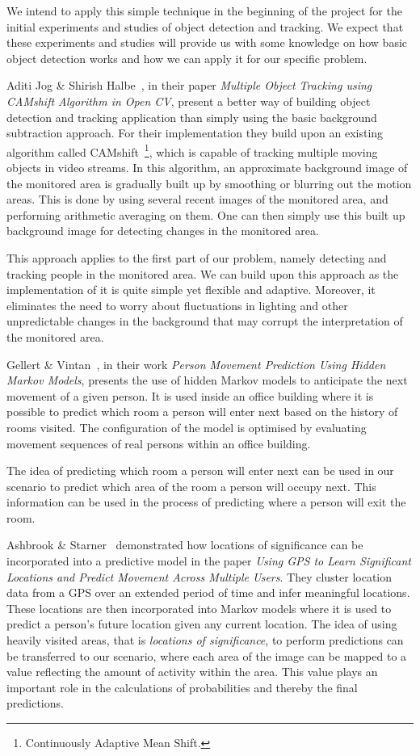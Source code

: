 We intend to apply this simple technique in the beginning of the project for the initial experiments and studies of object detection and tracking. We expect that these experiments and studies will provide us with some knowledge on how basic object detection works and how we can apply it for our specific problem.

Aditi Jog \& Shirish Halbe~\cite{jog_halbe}, in their paper \emph{Multiple Object Tracking using CAMshift Algorithm in Open CV}, present a better way of building object detection and tracking application than simply using the basic background subtraction approach. For their implementation they build upon an existing algorithm called CAMshift~\footnote{Continuously Adaptive Mean Shift.}, which is capable of tracking multiple moving objects in video streams. In this algorithm, an approximate background image of the monitored area is gradually built up by smoothing or blurring out the motion areas. This is done by using several recent images of the monitored area, and performing arithmetic averaging on them. One can then simply use this built up background image for detecting changes in the monitored area.

This approach applies to the first part of our problem, namely detecting and tracking people in the monitored area. We can build upon this approach as the implementation of it is quite simple yet flexible and adaptive. Moreover, it eliminates the need to worry about fluctuations in lighting and other unpredictable changes in the background that may corrupt the interpretation of the monitored area.

Gellert \& Vintan~\cite{gellert}, in their work \emph{Person Movement Prediction Using Hidden Markov Models}, presents the use of hidden Markov models to anticipate the next movement of a given person. It is used inside an office building where it is possible to predict which room a person will enter next based on the history of rooms visited. The configuration of the model is optimised by evaluating movement sequences of real persons within an office building.

The idea of predicting which room a person will enter next can be used in our scenario to predict which area of the room a person will occupy next. This information can be used in the process of predicting where a person will exit the room.

Ashbrook \& Starner~\cite{ashbrook} demonstrated how locations of significance can be incorporated into a predictive model in the paper \emph{Using GPS to Learn Significant Locations and Predict Movement Across Multiple Users}. They cluster location data from a GPS over an extended period of time and infer meaningful locations. These locations are then incorporated into Markov models where it is used to predict a person's future location given any current location. The idea of using heavily visited areas, that is \emph{locations of significance}, to perform predictions can be transferred to our scenario, where each area of the image can be mapped to a value reflecting the amount of activity within the area. This value plays an important role in the calculations of probabilities and thereby the final predictions.

